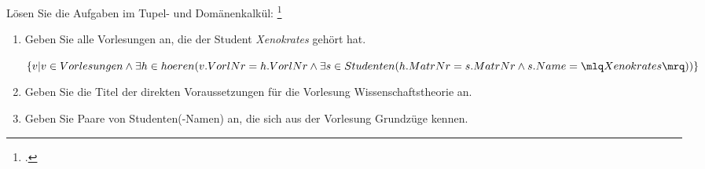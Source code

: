 \documentclass{bschlangaul-aufgabe}
\begin{document}

Lösen Sie die Aufgaben im Tupel- und Domänenkalkül:
\footcite{net:pdf:tum:db-tutor-uebung}

\begin{enumerate}
\item Geben Sie alle Vorlesungen an, die der Student
\emph{Xenokrates} gehört hat.

\begin{bAntwort}
$\{
  v |
  v \in Vorlesungen \land
  \exists h \in hoeren(
    v.VorlNr = h.VorlNr \land
    \exists s \in Studenten(
      h.MatrNr = s.MatrNr \land s.Name = \mlq Xenokrates \mrq
    )
  )
\}
$
\end{bAntwort}

\item Geben Sie die Titel der direkten Voraussetzungen für die
Vorlesung Wissenschaftstheorie an.

\item Geben Sie Paare von Studenten(-Namen) an, die sich aus
der Vorlesung Grundzüge kennen.

\end{enumerate}
\end{document}
